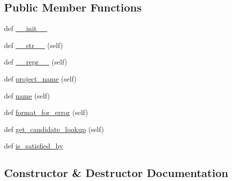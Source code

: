 \subsection*{Public Member Functions}
\begin{DoxyCompactItemize}
\item 
def \hyperlink{classpip_1_1__internal_1_1resolution_1_1resolvelib_1_1requirements_1_1SpecifierRequirement_a298aec1dbfdf570e86c1dfd18ca81c73}{\+\_\+\+\_\+init\+\_\+\+\_\+}
\item 
def \hyperlink{classpip_1_1__internal_1_1resolution_1_1resolvelib_1_1requirements_1_1SpecifierRequirement_adad29e93b0f89268dacb4a8a565469d7}{\+\_\+\+\_\+str\+\_\+\+\_\+} (self)
\item 
def \hyperlink{classpip_1_1__internal_1_1resolution_1_1resolvelib_1_1requirements_1_1SpecifierRequirement_a03da013498c8bcdebc9dc54a6ed45973}{\+\_\+\+\_\+repr\+\_\+\+\_\+} (self)
\item 
def \hyperlink{classpip_1_1__internal_1_1resolution_1_1resolvelib_1_1requirements_1_1SpecifierRequirement_a88acd8039ad23152b5a5c17016a2ebdf}{project\+\_\+name} (self)
\item 
def \hyperlink{classpip_1_1__internal_1_1resolution_1_1resolvelib_1_1requirements_1_1SpecifierRequirement_aaaa3c28411b40380615948c7514a571f}{name} (self)
\item 
def \hyperlink{classpip_1_1__internal_1_1resolution_1_1resolvelib_1_1requirements_1_1SpecifierRequirement_a559452361eecca10d837d23aec916ac6}{format\+\_\+for\+\_\+error} (self)
\item 
def \hyperlink{classpip_1_1__internal_1_1resolution_1_1resolvelib_1_1requirements_1_1SpecifierRequirement_a6ead0d4171dc01ada3af6e704c1f8367}{get\+\_\+candidate\+\_\+lookup} (self)
\item 
def \hyperlink{classpip_1_1__internal_1_1resolution_1_1resolvelib_1_1requirements_1_1SpecifierRequirement_a0c2a9d06c778eda6e8e2ffceecf08c77}{is\+\_\+satisfied\+\_\+by}
\end{DoxyCompactItemize}


\subsection{Constructor \& Destructor Documentation}
\mbox{\label{classpip_1_1__internal_1_1resolution_1_1resolvelib_1_1requirements_1_1SpecifierRequirement_a298aec1dbfdf570e86c1dfd18ca81c73}} 

